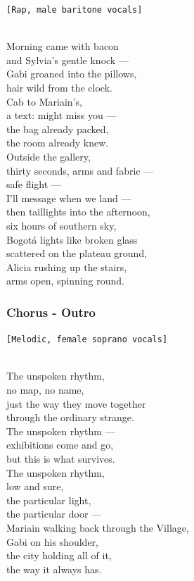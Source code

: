 \documentclass[]{article}
\begin{document}
\texttt{{[}Rap,\ male\ baritone\ vocals{]}}\strut \\
Morning came with bacon\\
and Sylvia's gentle knock ---\\
Gabi groaned into the pillows,\\
hair wild from the clock.\\
Cab to Mariain's,\\
a text: might miss you ---\\
the bag already packed,\\
the room already knew.\\
Outside the gallery,\\
thirty seconds, arms and fabric ---\\
safe flight ---\\
I'll message when we land ---\\
then taillights into the afternoon,\\
six hours of southern sky,\\
Bogotá lights like broken glass\\
scattered on the plateau ground,\\
Alicia rushing up the stairs,\\
arms open, spinning round.

\subsubsection{Chorus - Outro}\label{chorus---outro-1}

\texttt{{[}Melodic,\ female\ soprano\ vocals{]}}\strut \\
The unspoken rhythm,\\
no map, no name,\\
just the way they move together\\
through the ordinary strange.\\
The unspoken rhythm ---\\
exhibitions come and go,\\
but this is what survives.\\
The unspoken rhythm,\\
low and sure,\\
the particular light,\\
the particular door ---\\
Mariain walking back through the Village,\\
Gabi on his shoulder,\\
the city holding all of it,\\
the way it always has.
\end{document}
